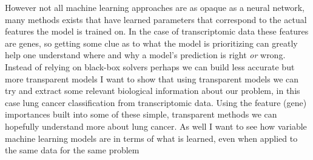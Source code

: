 However not all machine learning approaches are as opaque as a neural network, many methods exists that have learned parameters that correspond to the actual features the model is trained on.
In the case of transcriptomic data these features are genes, so getting some clue as to what the model is prioritizing can greatly help one understand where and why a model's prediction is right \emph{or} wrong.
Instead of relying on black-box solvers perhaps we can build less accurate but more transparent models
I want to show that using transparent models we can try and extract some relevant biological information about our problem, in this case lung cancer classification from transcriptomic data.
Using the feature (gene) importances built into some of these simple, transparent methods we can hopefully understand more about lung cancer.
As well I want to see how variable machine learning models are in terms of what is learned, even when applied to the same data for the same problem

